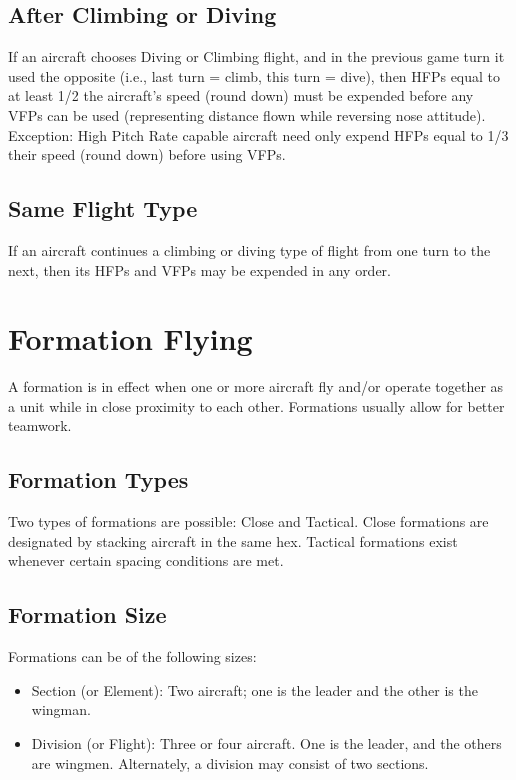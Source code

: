 \begin{advancedrules}
    \subsection{After Climbing or Diving}
    If an aircraft chooses Diving or Climbing flight, and in the previous game turn it used the opposite (i.e., last turn = climb, this turn = dive), then HFPs equal to at least 1/2 the aircraft's speed (round down) must be expended before any VFPs can be used (representing distance flown while reversing nose attitude). Exception: High Pitch Rate capable aircraft need only expend HFPs equal to 1/3 their speed (round down) before using VFPs.

    \subsection{Same Flight Type}
    If an aircraft continues a climbing or diving type of flight from one turn to the next, then its HFPs and VFPs may be expended in any order.

    \section{Formation Flying}
    \label{rule:formations}

    A formation is in effect when one or more aircraft fly and/or operate together as a unit while in close proximity to each other. Formations usually allow for better teamwork.

    \subsection{Formation Types} Two types of formations are possible: Close and Tactical. Close formations are designated by stacking aircraft in the same hex. Tactical formations exist whenever certain spacing conditions are met.

    \subsection{Formation Size} Formations can be of the following sizes:

    \begin{itemize}
        \item Section (or Element): Two aircraft; one is the leader and the other is the wingman.
        \item Division (or Flight): Three or four aircraft. One is the leader, and the others are wingmen. Alternately, a division may consist of two sections.
    \end{itemize}


\end{advancedrules}
